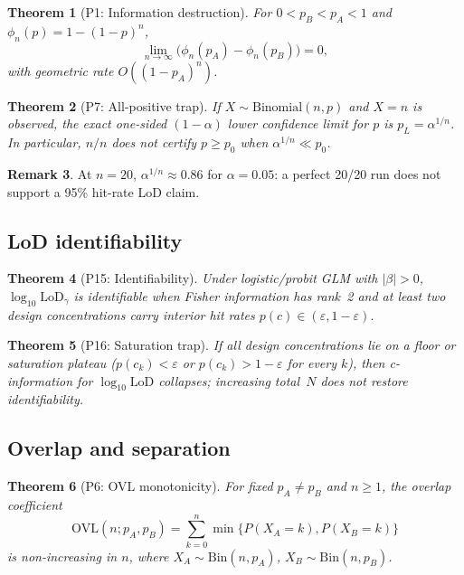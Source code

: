 \documentclass[11pt,a4paper]{article}
\newtheorem{theorem}{Theorem}
\theoremstyle{definition}
\newtheorem{remark}[theorem]{Remark}
\begin{document}
\begin{theorem}[P1: Information destruction]\label{thm:P1}
For $0 < p_B < p_A < 1$ and $\phi_n(p)=1-(1-p)^n$,
\[
  \lim_{n\to\infty}\bigl(\phi_n(p_A)-\phi_n(p_B)\bigr)=0,
\]
with geometric rate $O((1-p_A)^n)$.
\end{theorem}

\begin{theorem}[P7: All-positive trap]\label{thm:P7}
If $X\sim\mathrm{Binomial}(n,p)$ and $X=n$ is observed, the exact one-sided
$(1-\alpha)$ lower confidence limit for $p$ is $p_L=\alpha^{1/n}$.
In particular, $n/n$ does \emph{not} certify $p\ge p_0$ when $\alpha^{1/n}\ll p_0$.
\end{theorem}

\begin{remark}
At $n=20$, $\alpha^{1/n}\approx 0.86$ for $\alpha=0.05$: a perfect 20/20 run
does not support a 95\% hit-rate LoD claim.
\end{remark}

\subsection{LoD identifiability}

\begin{theorem}[P15: Identifiability]\label{thm:P15}
Under logistic/probit GLM with $|\beta|>0$, $\log_{10}\mathrm{LoD}_\gamma$ is identifiable
when Fisher information has rank~2 and at least two design concentrations carry
interior hit rates $p(c)\in(\varepsilon,1-\varepsilon)$.
\end{theorem}

\begin{theorem}[P16: Saturation trap]\label{thm:P16}
If all design concentrations lie on a floor or saturation plateau
($p(c_k)<\varepsilon$ or $p(c_k)>1-\varepsilon$ for every $k$), then
c-information for $\log_{10}\mathrm{LoD}$ collapses; increasing total~$N$
does not restore identifiability.
\end{theorem}

\subsection{Overlap and separation}

\begin{theorem}[P6: OVL monotonicity]\label{thm:P6}
For fixed $p_A\neq p_B$ and $n\ge 1$, the overlap coefficient
\[
  \mathrm{OVL}(n;p_A,p_B)=\sum_{k=0}^n \min\{P(X_A=k),P(X_B=k)\}
\]
is non-increasing in $n$, where $X_A\sim\mathrm{Bin}(n,p_A)$,
$X_B\sim\mathrm{Bin}(n,p_B)$.
\end{theorem}
\end{document}
